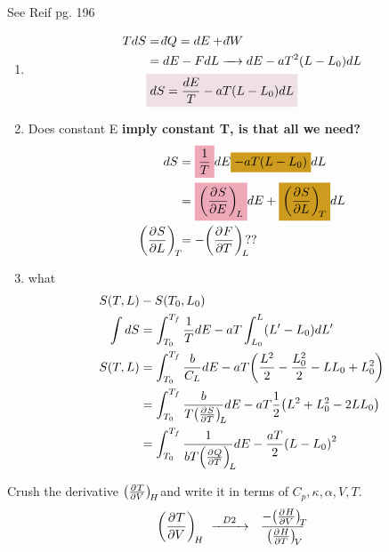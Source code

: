 \documentclass{article}
\def\dbar{{\mathchar'26\mkern-12mu d}} %
\begin{document}
    \begin{problem}[Reif 5.14]
        See Reif pg. 196
        \answerline
        \begin{enumerate}[label=(\alph*)]
            \item 
            \begin{align*}
                TdS&=\dbar Q=dE+\dbar W
                \\
                &=dE-FdL\xrightarrow{~~~}dE-aT^2(L-L_0)dL
                \\
                &\coloredanswer{dS=\frac{dE}{T}-aT(L-L_0)dL}
            \end{align*}
            \item \textcolor{Red1}{Does constant E \bf imply \rm constant T, is that all we need?}
            \begin{align*}
                dS&=\coloredanswer[Pink2]{\oo{T}}dE\coloredanswer[Goldenrod3]{-aT(L-L_0)}dL
                \\
                &=\coloredanswer[Pink2]{\pder{S}{E}[L]\ }dE+\coloredanswer[Goldenrod3]{\pder{S}{L}[T]\ }dL
                \\
                \pder{S}{L}[T]&=-\pder{F}{T}[L]??
            \end{align*}
            \item what
            \begin{align*}
                S(T,L)&-S(T_0,L_0)
                \\
                \int dS &=\int_{T_0}^{T_f}\oo{T}dE-aT\int_{L_0}^{L}(L'-L_0)dL' 
                \\
                S(T,L) &= \int_{T_0}^{T_f}\oo[b]{C_L}dE-aT\qty(\frac{L^2}{2}-\frac{L_0^2}{2}-LL_0+L_0^2)
                \\
                &= \int_{T_0}^{T_f}\oo[b]{T\pder{S}{T}[L]}dE-aT\oo{2}\qty(L^2+L_0^2-2LL_0)
                \\
                &=\int_{T_0}^{T_f}\oo{bT\pder{Q}{T}[L]}dE -\frac{aT}{2}\qty(L-L_0)^2
            \end{align*}
        \end{enumerate}
    \end{problem}\newpage
    \begin{problem}[Crushing (T/V)H]
        Crush the derivative $\pder{T}{V}[H]$ and write it in terms of $C_p,\kappa,\alpha,V,T$. 
        \answerline
        \begin{align*}
            \pder{T}{V}[H]
            \CrushStep{D2}
            \DerivCrush*{T}{V}{H}
        \end{align*}
    \end{problem}\newpage
\end{document}
